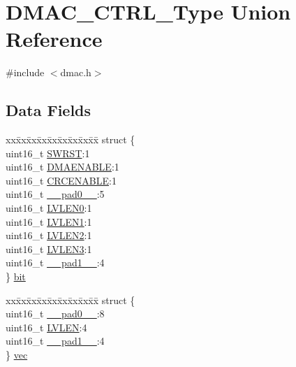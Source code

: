 \hypertarget{union_d_m_a_c___c_t_r_l___type}{}\section{D\+M\+A\+C\+\_\+\+C\+T\+R\+L\+\_\+\+Type Union Reference}
\label{union_d_m_a_c___c_t_r_l___type}


{\ttfamily \#include $<$dmac.\+h$>$}

\subsection*{Data Fields}
\begin{DoxyCompactItemize}
\item 
\begin{tabbing}
xx\=xx\=xx\=xx\=xx\=xx\=xx\=xx\=xx\=\kill
struct \{\\
\>uint16\_t \mbox{\hyperlink{union_d_m_a_c___c_t_r_l___type_a4987fcca11694bd2ffae6a773a9bfc24}{SWRST}}:1\\
\>uint16\_t \mbox{\hyperlink{union_d_m_a_c___c_t_r_l___type_ad0b333860fe05f82b824c91b663d54db}{DMAENABLE}}:1\\
\>uint16\_t \mbox{\hyperlink{union_d_m_a_c___c_t_r_l___type_aaf097c46e6fc030e16912fbfb6f8d2e9}{CRCENABLE}}:1\\
\>uint16\_t \mbox{\hyperlink{union_d_m_a_c___c_t_r_l___type_a77132c2c26a75f5b8751b235cda23828}{\_\_pad0\_\_}}:5\\
\>uint16\_t \mbox{\hyperlink{union_d_m_a_c___c_t_r_l___type_a460b4d7e033ebb27d3551ffbc5762b39}{LVLEN0}}:1\\
\>uint16\_t \mbox{\hyperlink{union_d_m_a_c___c_t_r_l___type_a9fad2170364e960f36ed7dff45a2f3f7}{LVLEN1}}:1\\
\>uint16\_t \mbox{\hyperlink{union_d_m_a_c___c_t_r_l___type_a2e25b89c364cacd6783e421c456d3b76}{LVLEN2}}:1\\
\>uint16\_t \mbox{\hyperlink{union_d_m_a_c___c_t_r_l___type_a6e9fb53dc31a5a53b27f451e44cf8465}{LVLEN3}}:1\\
\>uint16\_t \mbox{\hyperlink{union_d_m_a_c___c_t_r_l___type_ab72e3a1f2f7db8695c60c658f5a0f11a}{\_\_pad1\_\_}}:4\\
\} \mbox{\hyperlink{union_d_m_a_c___c_t_r_l___type_aa95acc6c162930921e95662af05693f3}{bit}}\\

\end{tabbing}\item 
\begin{tabbing}
xx\=xx\=xx\=xx\=xx\=xx\=xx\=xx\=xx\=\kill
struct \{\\
\>uint16\_t \mbox{\hyperlink{union_d_m_a_c___c_t_r_l___type_a77132c2c26a75f5b8751b235cda23828}{\_\_pad0\_\_}}:8\\
\>uint16\_t \mbox{\hyperlink{union_d_m_a_c___c_t_r_l___type_aca3036347a2804231a5c0f00b8c910ef}{LVLEN}}:4\\
\>uint16\_t \mbox{\hyperlink{union_d_m_a_c___c_t_r_l___type_ab72e3a1f2f7db8695c60c658f5a0f11a}{\_\_pad1\_\_}}:4\\
\} \mbox{\hyperlink{union_d_m_a_c___c_t_r_l___type_aaff821f6b245edaa823065b41e3450e0}{vec}}\\


\end{tabbing}
\end{DoxyCompactItemize}
